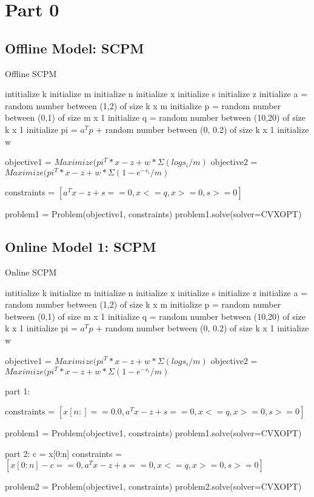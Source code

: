 \documentclass[12pt]{article}
\begin{document}
\section*{Part 0}
\subsection*{Offline Model: SCPM}
\begin{algorithm}
\caption{Offline SCPM}
\begin{algorithmic}
\STATE intitialize k
\STATE initialize m
\STATE initialize n
\STATE initialize x
\STATE initialize s
\STATE initialize z
\STATE initialize a = random number between (1,2) of size k x m 
\STATE initialize p = random number between (0,1) of size m x 1
\STATE initialize q = random number between (10,20) of size k x 1
\STATE initialize pi = $a^{T}p$ + random number between (0, 0.2) of size k x 1
\STATE initialize w

\STATE objective1 = $Maximize(pi^{T}*x -z + w*\Sigma(logs_i/m)$
\STATE objective2 = $Maximize(pi^{T}*x -z + w*\Sigma(1-e^{-s_i}/m)$

\STATE constraints = $[a^{T}x  - z + s == 0, x <= q, x >= 0, s >= 0]$

\STATE problem1 = Problem(objective1, constraints)
\STATE problem1.solve(solver=CVXOPT) 

\end{algorithmic}
\end{algorithm}
\pagebreak
\subsection*{Online Model 1: SCPM}
\begin{algorithm}
\caption{Online SCPM}
\begin{algorithmic}
\STATE intitialize k
\STATE initialize m
\STATE initialize n
\STATE initialize x
\STATE initialize s
\STATE initialize z
\STATE initialize a = random number between (1,2) of size k x m 
\STATE initialize p = random number between (0,1) of size m x 1
\STATE initialize q = random number between (10,20) of size k x 1
\STATE initialize pi = $a^{T}p$ + random number between (0, 0.2) of size k x 1
\STATE initialize w

\STATE objective1 = $Maximize(pi^{T}*x -z + w*\Sigma(logs_i/m)$
\STATE objective2 = $Maximize(pi^{T}*x -z + w*\Sigma(1-e^{-s_i}/m)$

\STATE part 1:

\STATE constraints = $[x[n:] == 0.0,a^{T}x  - z + s == 0, x <= q, x >= 0, s >= 0]$

\STATE problem1 = Problem(objective1, constraints)
\STATE problem1.solve(solver=CVXOPT) 

\STATE part 2:
\STATE c = x[0:n]
\STATE constraints = $[x[0:n] - c == 0,a^{T}x  - z + s == 0, x <= q, x >= 0, s >= 0]$

problem2 = Problem(objective1, constraints)
problem2.solve(solver=CVXOPT) 
\end{algorithmic}
\end{algorithm}
\pagebreak
\end{document}
